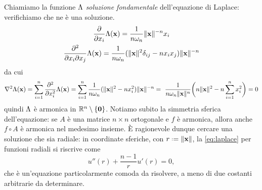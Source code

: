 Chiamiamo la funzione $\Lambda$ \emph{soluzione fondamentale} dell'equazione di Laplace: verifichiamo che ne è una soluzione.
\begin{equation}
    \begin{gathered}
        \frac{\partial {}}{\partial {x_i}}\Lambda(\mathbf{x})=\frac1{n\omega_n}\lVert\mathbf{x}\rVert^{-n}x_i\\
        \frac{\partial^2}{\partial x_i\partial x_j}\Lambda(\mathbf{x})=\frac1{n\omega_n}(\lVert\mathbf{x}\rVert^2\delta_{ij}-nx_ix_j)\lVert\mathbf{x}\rVert^{-n}
    \end{gathered}
\end{equation}
da cui
\begin{multline}
    \nabla^2\Lambda(\mathbf{x})=
    \sum_{i=1}^n\frac{\partial^2}{\partial x_i^2}\Lambda(\mathbf{x})=
    \sum_{i=1}^n\frac1{n\omega_n}(\lVert\mathbf{x}\rVert^2-nx_i^2)\lVert\mathbf{x}\rVert^{-n}=\
    \frac1{n\omega_n\lVert\mathbf{x}\rVert^n}\biggl(n\lVert\mathbf{x}\rVert^2-n\sum_{i=1}^nx_i^2\biggr)=
    0
\end{multline}
quindi $\Lambda$ è armonica in $\mathbb{R}^n\setminus\{\mathbf{0}\}$.
Notiamo subito la simmetria sferica dell'equazione: se $A$ è una matrice $n\times n$ ortogonale e $f$ è armonica, allora anche $f\circ A$ è armonica nel medesimo insieme.
È ragionevole dunque cercare una soluzione che sia radiale: in coordinate sferiche, con $r\defeq\norm{\vec x}$, la \eqref{eq:laplace} per funzioni radiali si riscrive come
\begin{equation}
    u''(r)+\frac{n-1}{r}u'(r)=0,
\end{equation}
che è un'equazione particolarmente comoda da risolvere, a meno di due costanti arbitrarie da determinare.

